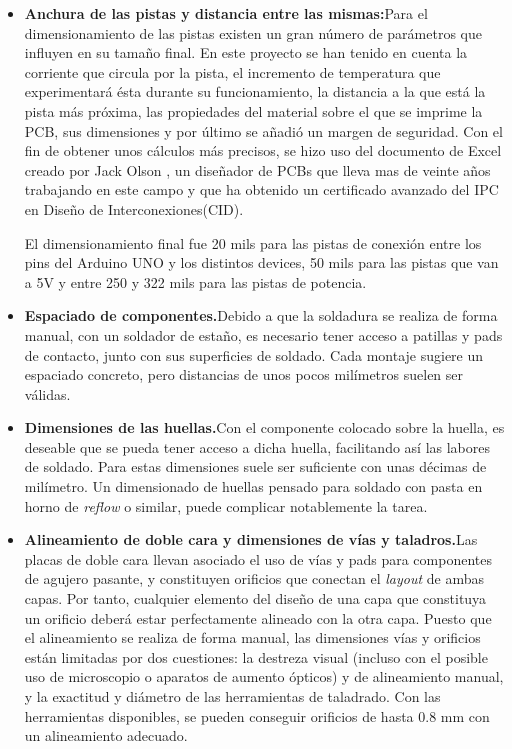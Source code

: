\begin{itemize}
	\item \textbf{Anchura de las pistas y distancia entre las mismas:}Para el dimensionamiento de las pistas existen un gran número de parámetros que influyen en su tamaño final. En este proyecto se han tenido en cuenta la corriente que circula por la pista, el incremento de temperatura que experimentará ésta durante su funcionamiento, la distancia a la que está la pista más próxima, las propiedades del material sobre el que se imprime la \acrshort{PCB}, sus dimensiones y por último se añadió un margen de seguridad. Con el fin de obtener unos cálculos más precisos, se hizo uso del documento de Excel creado por Jack Olson \cite{Jack}, un diseñador de \acrshort{PCB}s que lleva mas de veinte años trabajando en este campo y que ha obtenido un certificado avanzado del IPC en Diseño de Interconexiones(CID).
	
El dimensionamiento final fue 20 mils para las pistas de conexión entre los pins del Arduino UNO y los distintos devices, 50 mils para las pistas que van a 5V y entre 250 y 322 mils para las pistas de potencia.
	
	\item \textbf{Espaciado de componentes.}Debido a que la soldadura se realiza de forma manual,
con un soldador de estaño, es necesario tener acceso a patillas y pads de contacto,
junto con sus superficies de soldado. Cada montaje sugiere un espaciado concreto, pero
distancias de unos pocos milímetros suelen ser válidas.

	\item \textbf{Dimensiones de las huellas.}Con el componente colocado sobre la huella, es deseable
que se pueda tener acceso a dicha huella, facilitando así las labores de soldado. Para
estas dimensiones suele ser suficiente con unas décimas de milímetro. Un dimensionado
de huellas pensado para soldado con pasta en horno de \textit{reflow} o similar, puede complicar
notablemente la tarea.

	\item \textbf{Alineamiento de doble cara y dimensiones de vías y taladros.}Las placas
de doble cara llevan asociado el uso de vías y pads para componentes de agujero
pasante, y constituyen orificios que conectan el \textit{layout} de ambas capas. Por tanto,
cualquier elemento del diseño de una capa que constituya un orificio deberá estar
perfectamente alineado con la otra capa. Puesto que el alineamiento se realiza de forma
manual, las dimensiones vías y orificios están limitadas por dos cuestiones: la destreza
visual (incluso con el posible uso de microscopio o aparatos de aumento ópticos) y de
alineamiento manual, y la exactitud y diámetro de las herramientas de taladrado. Con
las herramientas disponibles, se pueden conseguir orificios de hasta 0.8 mm con un
alineamiento adecuado.


\end{itemize}
